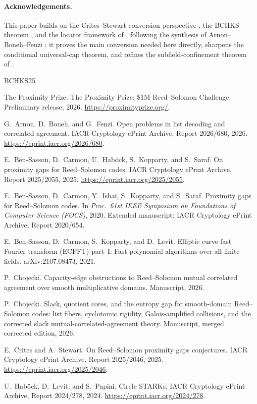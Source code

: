\documentclass[11pt]{article}
\theoremstyle{definition}
\theoremstyle{remark}
\begin{document}
\paragraph{Acknowledgements.} This paper builds on the Crites--Stewart conversion perspective \cite{CS25}, the BCHKS theorem \cite{BCHKS25}, and the locator framework of \cite{Cho26a,Cho26b}, following the synthesis of Arnon--Boneh--Fenzi \cite{ABF26}; it proves the main conversion needed here directly, sharpens the conditional universal-cap theorem, and refines the subfield-confinement theorem of \cite{Cho26b}.


\begin{thebibliography}{BCHKS25}

The Proximity Prize.
\newblock The Proximity Prize: \$1M Reed--Solomon Challenge.
\newblock Preliminary release, 2026.
\newblock \url{https://proximityprize.org/}.


G.~Arnon, D.~Boneh, and G.~Fenzi.
\newblock Open problems in list decoding and correlated agreement.
\newblock IACR Cryptology ePrint Archive, Report 2026/680, 2026.
\newblock \url{https://eprint.iacr.org/2026/680}.

E.~Ben-Sasson, D.~Carmon, U.~Hab{\"o}ck, S.~Kopparty, and S.~Saraf.
\newblock On proximity gaps for Reed--Solomon codes.
\newblock IACR Cryptology ePrint Archive, Report 2025/2055, 2025.
\newblock \url{https://eprint.iacr.org/2025/2055}.


E.~Ben-Sasson, D.~Carmon, Y.~Ishai, S.~Kopparty, and S.~Saraf.
\newblock Proximity gaps for Reed--Solomon codes.
\newblock In \emph{Proc.\ 61st IEEE Symposium on Foundations of Computer Science (FOCS)}, 2020.
\newblock Extended manuscript: IACR Cryptology ePrint Archive, Report 2020/654.

E.~Ben-Sasson, D.~Carmon, S.~Kopparty, and D.~Levit.
\newblock Elliptic curve fast Fourier transform (ECFFT) part~I: Fast polynomial algorithms over all finite fields.
\newblock arXiv:2107.08473, 2021.

P.~Chojecki.
\newblock Capacity-edge obstructions to Reed--Solomon mutual correlated agreement over smooth multiplicative domains.
\newblock Manuscript, 2026.

P.~Chojecki.
\newblock Slack, quotient cores, and the entropy gap for smooth-domain Reed--Solomon codes: list fibers, cyclotomic rigidity, Galois-amplified collisions, and the corrected slack mutual-correlated-agreement theory.
\newblock Manuscript, merged corrected edition, 2026.

E.~Crites and A.~Stewart.
\newblock On Reed--Solomon proximity gaps conjectures.
\newblock IACR Cryptology ePrint Archive, Report 2025/2046, 2025.
\newblock \url{https://eprint.iacr.org/2025/2046}.

U.~Hab{\"o}ck, D.~Levit, and S.~Papini.
\newblock Circle STARKs.
\newblock IACR Cryptology ePrint Archive, Report 2024/278, 2024.
\newblock \url{https://eprint.iacr.org/2024/278}.

\end{thebibliography}
\end{document}
